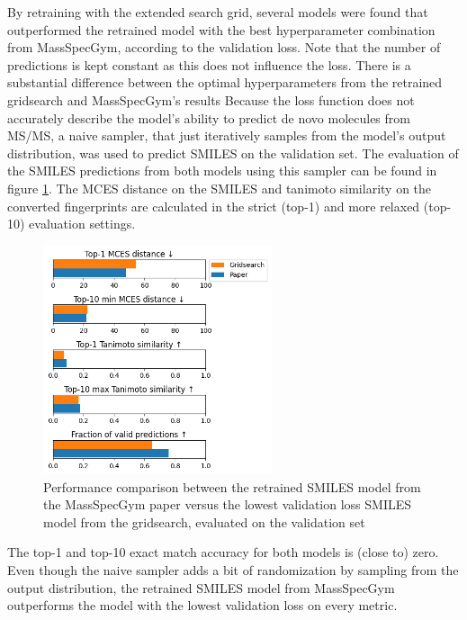 By retraining with the extended search grid, several models were found that outperformed the retrained model with the best hyperparameter combination from MassSpecGym, according to the validation loss.
Note that the number of predictions is kept constant as this does not influence the loss.
There is a substantial difference between the optimal hyperparameters from the retrained gridsearch and MassSpecGym's results
Because the loss function does not accurately describe the model's ability to predict de novo molecules from \ac{MS/MS},
a naive sampler, that just iteratively samples from the model's output distribution, was used to predict SMILES on the validation set.
The evaluation of the SMILES predictions from both models using this sampler can be found in figure \ref{fig:gridsearch_vs_paper}.
The \ac{MCES} distance on the SMILES and tanimoto similarity on the converted fingerprints are calculated in the strict (top-1) and more relaxed (top-10) evaluation settings.

\begin{figure}[h]
    \centering
    \includegraphics[width=0.6\textwidth]{figures/results/gridsearch_vs_paper.png}
    \caption{Performance comparison between the retrained SMILES model from the MassSpecGym paper versus the lowest validation loss SMILES model from the gridsearch, evaluated on the validation set}
    \label{fig:gridsearch_vs_paper}
\end{figure}

The top-1 and top-10 exact match accuracy for both models is (close to) zero.
Even though the naive sampler adds a bit of randomization by sampling from the output distribution, the retrained SMILES model from MassSpecGym outperforms the model with the lowest validation loss on every metric.

